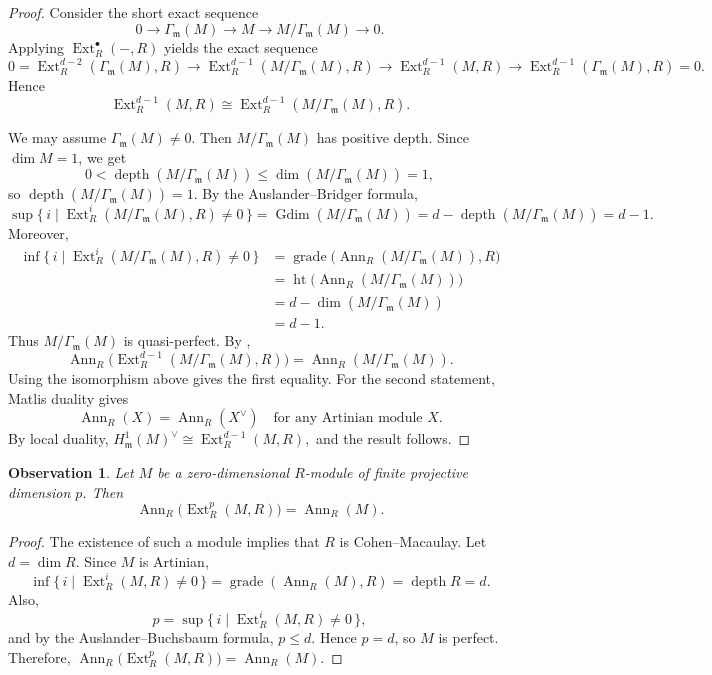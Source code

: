 \documentclass[11pt,a4paper]{amsart}
\numberwithin{equation}{section}
\newtheorem{observation}[theorem]{Observation}
\DeclareMathOperator{\Gdim}{Gdim}
\DeclareMathOperator{\grade}{grade}
\DeclareMathOperator{\Ann}{Ann}\DeclareMathOperator{\ann}{Ann}
\DeclareMathOperator{\Ext}{Ext}
\DeclareMathOperator{\depth}{depth}
\begin{document}
\begin{proof}
	Consider the short exact sequence
	\[
	0 \longrightarrow \Gamma_{\mathfrak m}(M)
	\longrightarrow M
	\longrightarrow M/\Gamma_{\mathfrak m}(M)
	\longrightarrow 0 .
	\]
	Applying $\Ext^{\bullet}_R(-,R)$ yields the exact sequence
	\[
	0 = \Ext^{d-2}_R(\Gamma_{\mathfrak m}(M),R)
	\longrightarrow \Ext^{d-1}_R(M/\Gamma_{\mathfrak m}(M),R)
	\longrightarrow \Ext^{d-1}_R(M,R)
	\longrightarrow \Ext^{d-1}_R(\Gamma_{\mathfrak m}(M),R) = 0 .
	\]
	Hence
	\[
	\Ext^{d-1}_R(M,R)
	\cong \Ext^{d-1}_R(M/\Gamma_{\mathfrak m}(M),R).
	\]
	
	We may assume $\Gamma_{\mathfrak m}(M)\neq 0$. Then $M/\Gamma_{\mathfrak m}(M)$ has positive depth. Since $\dim M=1$, we get
	\[
	0 < \depth\!\left(M/\Gamma_{\mathfrak m}(M)\right)
	\le \dim\!\left(M/\Gamma_{\mathfrak m}(M)\right)
	= 1,
	\]
	so $\depth(M/\Gamma_{\mathfrak m}(M))=1$.
	By the Auslander–Bridger formula,
	\[
	\sup\{\, i \mid \Ext^i_R(M/\Gamma_{\mathfrak m}(M),R)\neq 0 \,\}
	= \Gdim(M/\Gamma_{\mathfrak m}(M))
	= d - \depth(M/\Gamma_{\mathfrak m}(M))
	= d-1.
	\]
	Moreover,
	\begin{align*}
	\inf\{\, i \mid \Ext^i_R(M/\Gamma_{\mathfrak m}(M),R)\neq 0 \,\}
	&= \grade\!\big(\Ann_R(M/\Gamma_{\mathfrak m}(M)), R\big) \\
	&= \operatorname{ht}\!\big(\Ann_R(M/\Gamma_{\mathfrak m}(M))\big) \\
	&= d - \dim(M/\Gamma_{\mathfrak m}(M)) \\
	&= d-1 .
	\end{align*}
	Thus $M/\Gamma_{\mathfrak m}(M)$ is quasi-perfect. By \cite[4.11]{supp},
	\[
	\Ann_R\!\big(\Ext^{d-1}_R(M/\Gamma_{\mathfrak m}(M),R)\big)
	= \Ann_R\!\left(M/\Gamma_{\mathfrak m}(M)\right).
	\]
	Using the isomorphism above gives the first equality.
	For the second statement, Matlis duality gives
	\[
	\Ann_R(X) = \Ann_R(X^\vee)
	\quad \text{for any Artinian module } X.
	\]
	By local duality,
	\(
	H^{1}_{\mathfrak m}(M)^\vee \cong \Ext^{d-1}_R(M,R),
	\)
	and the result follows.
\end{proof}

\begin{observation}
	Let $M$ be a zero-dimensional $R$-module of finite projective dimension $p$. Then
	\[
	\Ann_R\!\big(\Ext^{p}_R(M,R)\big) = \Ann_R(M).
	\]
\end{observation}

\begin{proof}
	The existence of such a module implies that $R$ is Cohen–Macaulay. Let $d=\dim R$. Since $M$ is Artinian,
	\[
	\inf\{\, i \mid \Ext^i_R(M,R)\neq 0 \,\}
	= \grade(\Ann_R(M),R)
	= \depth R
	= d.
	\]
	Also,
	\[
	p = \sup\{\, i \mid \Ext^i_R(M,R)\neq 0 \,\},
	\]
	and by the Auslander–Buchsbaum formula, $p\le d$. Hence $p=d$, so $M$ is perfect. Therefore,
	\(
	\Ann_R\!\big(\Ext^{p}_R(M,R)\big) = \Ann_R(M).
	\)
\end{proof}
\end{document}
